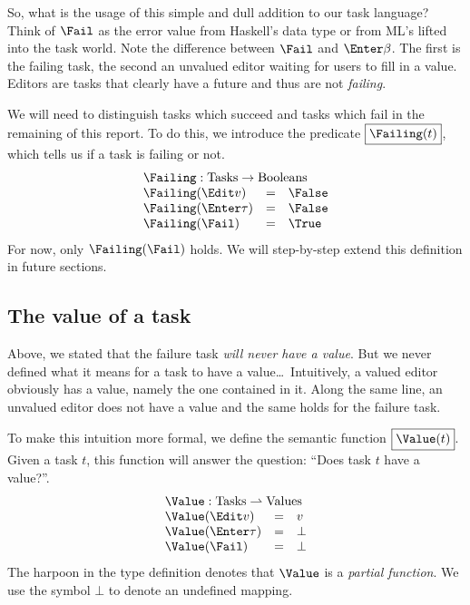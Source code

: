 So, what is the usage of this simple and dull addition to our task language?
Think of $\Fail$ as the error value  from Haskell's  data type
or  from ML's  lifted into the task world.
Note the difference between $\Fail$ and $\Enter\beta$.
The first is the failing task,
the second an unvalued editor waiting for users to fill in a value.
Editors are tasks that clearly have a future and thus are not \emph{failing}.

We will need to distinguish tasks which succeed and tasks which fail in the remaining of this report.
To do this,
we introduce the predicate $\boxed{\Failing(t)}$,
which tells us if a task is failing or not.
\begin{equation*}
  \begin{array}{lcl}
    \multicolumn{3}{l}{\Failing : \mathrm{Tasks} \to \mathrm{Booleans}} \\
    \Failing(\Edit v)     &=& \False \\
    \Failing(\Enter \tau) &=& \False \\
    \Failing(\Fail)       &=& \True
  \end{array}
\end{equation*}
For now,
only $\Failing(\Fail)$ holds.
We will step-by-step extend this definition in future sections.


\subsection{The value of a task}
\label{sec:value}

Above, we stated that the failure task \emph{will never have a value}.
But we never defined what it means for a task to have a value\ldots\
Intuitively,
a valued editor obviously has a value,
namely the one contained in it.
Along the same line,
an unvalued editor does not have a value
and the same holds for the failure task.

To make this intuition more formal,
we define the semantic function $\boxed{\Value(t)}$.
Given a task $t$, this function will answer the question:
\enquote{Does task $t$ have a value?}.
\begin{equation*}
  \begin{array}{lcl}
    \multicolumn{3}{l}{\Value : \mathrm{Tasks} \rightharpoonup \mathrm{Values}} \\
    \Value(\Edit v)     &=& v \\
    \Value(\Enter \tau) &=& \bot \\
    \Value(\Fail)       &=& \bot
  \end{array}
\end{equation*}
The harpoon in the type definition denotes that $\Value$ is a \emph{partial function}.
We use the symbol $\bot$ to denote an undefined mapping.

